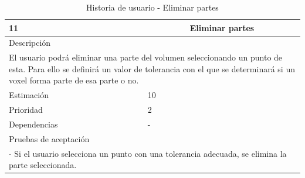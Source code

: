 \begin{table}[H]
	\begin{center}
		\begin{tabular} {|l|c|l|}
			\hline
			11 & \multicolumn{2}{c|}{Eliminar partes} \\ \hline \hline
			\multicolumn{3}{|l|}{Descripción} \\ \hline
			\multicolumn{3}{|p{12cm}|}{El usuario podrá eliminar una parte del volumen seleccionando un punto de esta. Para ello se definirá un valor de tolerancia con el que se determinará si un voxel forma parte de esa parte o no.} \\ \hline
			\multicolumn{2}{|l|}{Estimación} & 10 \\ \hline
			\multicolumn{2}{|l|}{Prioridad} & 2 \\ \hline
			\multicolumn{2}{|l|}{Dependencias} & - \\ \hline
			\multicolumn{3}{|l|}{Pruebas de aceptación} \\ \hline
			\multicolumn{3}{|p{12cm}|}{ - Si el usuario selecciona un punto con una tolerancia adecuada, se elimina la parte seleccionada.} \\ \hline
		\end{tabular}
	\end{center}
	\caption{Historia de usuario - Eliminar partes}
	\label{tab:hu_eliminar_partes}
\end{table}